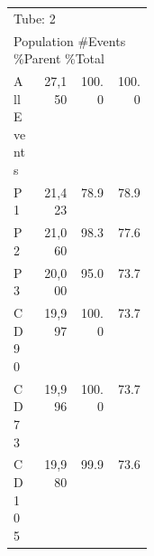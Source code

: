 \documentclass[UTF8,10pt,a4paper,fontset=fandol]{ctexart}
\newcommand{\fieldvalue}[1]{#1}
\begin{document}
\begin{center}
\small
\begin{tabular}{|p{0.18\linewidth}|r|r|r|}
\hline
\multicolumn{4}{|l|}{Tube: 2}\\
\multicolumn{4}{|l|}{Population \hfill \#Events \hfill \%Parent \hfill \%Total}\\
\hline
All Events &
\fieldvalue{27,150} &
\fieldvalue{100.0} &
\fieldvalue{100.0}\\
\hline
P1 &
\fieldvalue{21,423} &
\fieldvalue{78.9} &
\fieldvalue{78.9}\\
\hline
P2 &
\fieldvalue{21,060} &
\fieldvalue{98.3} &
\fieldvalue{77.6}\\
\hline
P3 &
\fieldvalue{20,000} &
\fieldvalue{95.0} &
\fieldvalue{73.7}\\
\hline
CD90 &
\fieldvalue{19,997} &
\fieldvalue{100.0} &
\fieldvalue{73.7}\\
\hline
CD73 &
\fieldvalue{19,996} &
\fieldvalue{100.0} &
\fieldvalue{73.7}\\
\hline
CD105 &
\fieldvalue{19,980} &
\fieldvalue{99.9} &
\fieldvalue{73.6}\\
\hline
\end{tabular}
\end{center}
\end{document}

